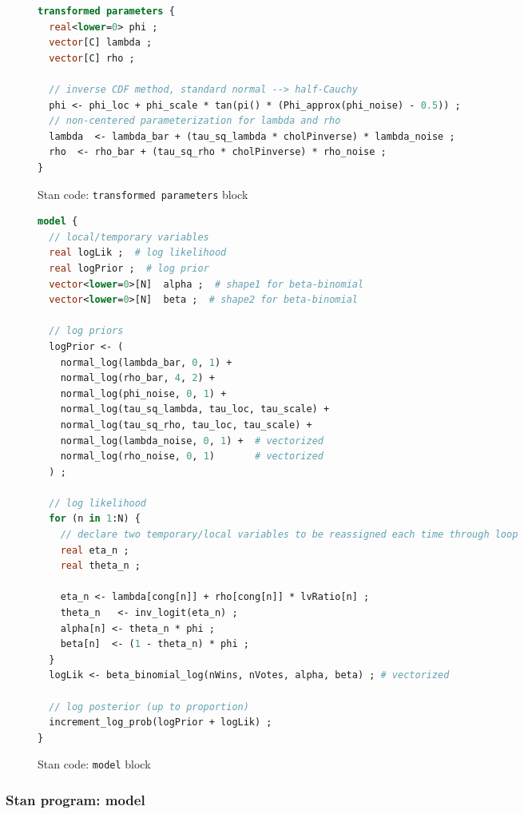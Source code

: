 \begin{figure}
\begin{lstlisting}[language=Stan, frame=trBL]
transformed parameters {
  real<lower=0> phi ;
  vector[C] lambda ;
  vector[C] rho ;
  
  // inverse CDF method, standard normal --> half-Cauchy
  phi <- phi_loc + phi_scale * tan(pi() * (Phi_approx(phi_noise) - 0.5)) ;
  // non-centered parameterization for lambda and rho
  lambda  <- lambda_bar + (tau_sq_lambda * cholPinverse) * lambda_noise ;
  rho  <- rho_bar + (tau_sq_rho * cholPinverse) * rho_noise ;
}
\end{lstlisting}
\caption{Stan code: {\tt transformed parameters} block}
\label{stan_trans_parameters}
\end{figure}



\begin{figure*}[p]
\begin{lstlisting}[language=Stan, frame=trBL]
model {
  // local/temporary variables
  real logLik ;  # log likelihood
  real logPrior ;  # log prior
  vector<lower=0>[N]  alpha ;  # shape1 for beta-binomial 
  vector<lower=0>[N]  beta ;  # shape2 for beta-binomial
  
  // log priors
  logPrior <- (
    normal_log(lambda_bar, 0, 1) + 
    normal_log(rho_bar, 4, 2) + 
    normal_log(phi_noise, 0, 1) +
    normal_log(tau_sq_lambda, tau_loc, tau_scale) +
    normal_log(tau_sq_rho, tau_loc, tau_scale) +
    normal_log(lambda_noise, 0, 1) +  # vectorized
    normal_log(rho_noise, 0, 1)       # vectorized
  ) ;
  
  // log likelihood
  for (n in 1:N) {
    // declare two temporary/local variables to be reassigned each time through loop
    real eta_n ; 
    real theta_n ;
    
    eta_n <- lambda[cong[n]] + rho[cong[n]] * lvRatio[n] ;
    theta_n   <- inv_logit(eta_n) ;    
    alpha[n] <- theta_n * phi ;
    beta[n]  <- (1 - theta_n) * phi ;
  }
  logLik <- beta_binomial_log(nWins, nVotes, alpha, beta) ; # vectorized
  
  // log posterior (up to proportion)
  increment_log_prob(logPrior + logLik) ; 
}
\end{lstlisting}
\caption{Stan code: {\tt model} block}
\label{stan_model}
\end{figure*}
%


\subsubsection{Stan program: model}

